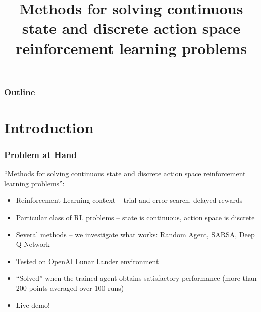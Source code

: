 \documentclass{beamer}
\title[RL Methods]{Methods for solving
	continuous state and discrete action space 
	reinforcement learning problems} %
\begin{document}
\begin{frame}
\titlepage %
\end{frame}

\begin{frame}
\frametitle{Outline} %
\tableofcontents %
\end{frame}


\section{Introduction} %




\begin{frame}
\frametitle{Problem at Hand}
``Methods for solving
continuous state and discrete action space 
reinforcement learning problems'':

\begin{itemize}
\item Reinforcement Learning context -- trial-and-error search,
delayed rewards
\item Particular class of RL problems -- state is continuous,
action space is discrete 
\item Several methods -- we investigate what 
works: Random Agent, SARSA, Deep Q-Network 
\item Tested on OpenAI Lunar Lander environment
\item ``Solved'' when the trained agent obtains satisfactory 
performance (more than 200 points averaged over 100 runs)
\item Live demo!
\end{itemize}
\end{frame}
\end{document}
